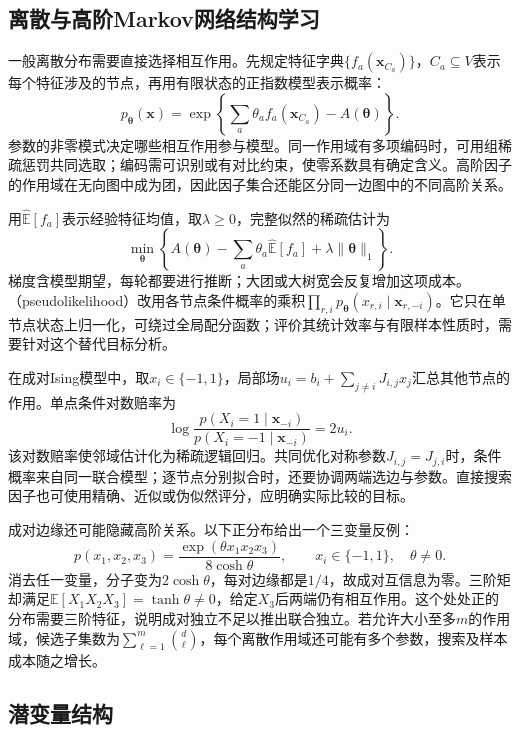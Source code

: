 \subsection{离散与高阶Markov网络结构学习}
\label{sec:pgm-structure-learning-discrete}

一般离散分布需要直接选择相互作用。先规定特征字典$\{f_a(\bm{x}_{C_a})\}$，$C_a\subseteq V$表示每个特征涉及的节点，再用有限状态的正指数模型表示概率：
\[
  p_{\bm{\theta}}(\bm{x})
  =\exp\!\left\{\sum_a\theta_a f_a(\bm{x}_{C_a})
                    -A(\bm{\theta})\right\}.
\]
参数的非零模式决定哪些相互作用参与模型。同一作用域有多项编码时，可用组稀疏惩罚共同选取；编码需可识别或有对比约束，使零系数具有确定含义。高阶因子的作用域在无向图中成为团，因此因子集合还能区分同一边图中的不同高阶关系。

用$\widehat{\mathbb{E}}[f_a]$表示经验特征均值，取$\lambda\geq0$，完整似然的稀疏估计为
\[
  \min_{\bm{\theta}}\left\{
    A(\bm{\theta})-\sum_a\theta_a\widehat{\mathbb{E}}[f_a]
      +\lambda\lVert\bm{\theta}\rVert_1\right\}.
\]
梯度含模型期望，每轮都要进行推断；大团或大树宽会反复增加这项成本。（pseudolikelihood）改用各节点条件概率的乘积$\prod_{r,i}p_{\bm{\theta}}(x_{r,i}\mid\bm{x}_{r,-i})$。它只在单节点状态上归一化，可绕过全局配分函数；评价其统计效率与有限样本性质时，需要针对这个替代目标分析。

在成对Ising模型中，取$x_i\in\{-1,1\}$，局部场$u_i=b_i+\sum_{j\ne i}J_{i,j}x_j$汇总其他节点的作用。单点条件对数赔率为
\[
  \log\frac{p(X_i=1\mid\bm{x}_{-i})}
                {p(X_i=-1\mid\bm{x}_{-i})}=2u_i.
\]
该对数赔率使邻域估计化为稀疏逻辑回归。共同优化对称参数$J_{i,j}=J_{j,i}$时，条件概率来自同一联合模型；逐节点分别拟合时，还要协调两端选边与参数。直接搜索因子也可使用精确、近似或伪似然评分，应明确实际比较的目标。

成对边缘还可能隐藏高阶关系。以下正分布给出一个三变量反例：
\[
  p(x_1,x_2,x_3)
  =\frac{\exp(\theta x_1x_2x_3)}{8\cosh\theta},
  \qquad x_i\in\{-1,1\},\quad \theta\ne0.
\]
消去任一变量，分子变为$2\cosh\theta$，每对边缘都是$1/4$，故成对互信息为零。三阶矩却满足$\mathbb{E}[X_1X_2X_3]=\tanh\theta\ne0$，给定$X_3$后两端仍有相互作用。这个处处正的分布需要三阶特征，说明成对独立不足以推出联合独立。若允许大小至多$m$的作用域，候选子集数为$\sum_{\ell=1}^{m}\binom d\ell$，每个离散作用域还可能有多个参数，搜索及样本成本随之增长。

\subsection{潜变量结构}
\label{sec:pgm-structure-learning-latent}


